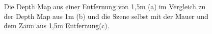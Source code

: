 \begin{figure}[H]
    \centering
    \qquad
    \qquad
    \qquad
    \caption{Die Depth Map aus einer Entfernung von 1,5m (a) im Vergleich zu der Depth Map aus 1m (b) und die Szene selbst mit der Mauer und dem Zaun aus 1,5m Entfernung(c).}%
    \label{fig:technische-umsetzung-arcore-depth-problem}
\end{figure}
